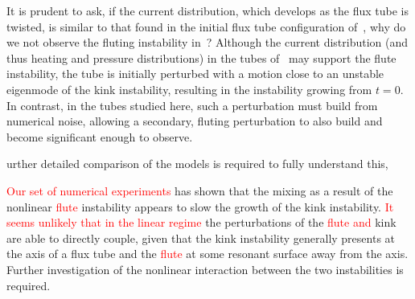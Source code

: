 \documentclass[12pt]{article}
\newcommand{\rs}[2]{\textcolor{red}{#2}}
\begin{document}
It is prudent to ask, if the current distribution, which develops as the flux tube is twisted, is similar to that found in the initial flux tube configuration of~\cite{quinnEffectAnisotropicViscosity2020}, why do we not observe the fluting instability in~\cite{quinnEffectAnisotropicViscosity2020}? Although the current distribution (and thus heating and pressure distributions) in the tubes of~\cite{quinnEffectAnisotropicViscosity2020} may support the flute instability, the tube is initially perturbed with a motion close to an unstable eigenmode of the kink instability, resulting in the instability growing from $t=0$. In contrast, in the tubes studied here, such a perturbation must build from numerical noise, allowing a secondary, fluting perturbation to also build and become significant enough to observe.

urther detailed comparison of the models is required to fully understand this,  

\rs{This set of experiments}{Our set of numerical experiments} has
shown that the mixing as a result of the nonlinear \rs{fluting}{flute}
instability appears to slow the growth of the kink instability. \rs{In
  the linear regime it seems unlikely that}{It seems unlikely that in
  the linear regime} the \rs{linear}{} perturbations of \rs{either}{} the
\rs{fluting}{flute} \rs{or}{and} kink are able to directly couple, given that
the kink instability generally presents at the axis of a flux tube and
the \rs{fluting}{flute} at some resonant surface away from the
axis. Further investigation of the nonlinear interaction between the
two instabilities is required. 
\end{document}
